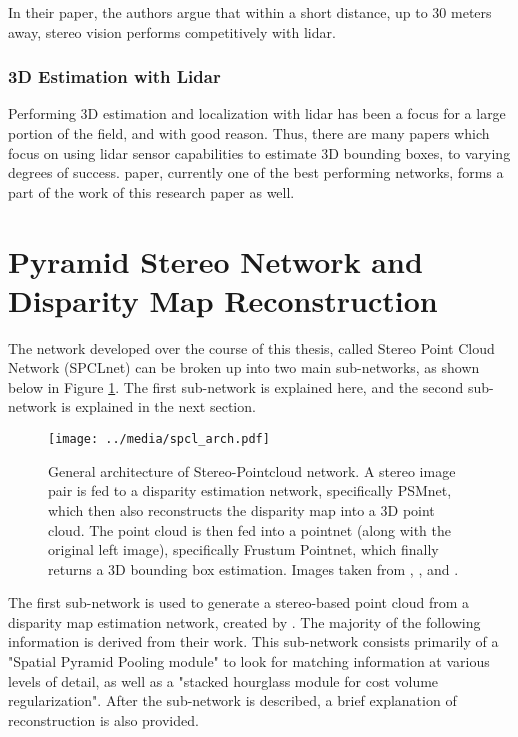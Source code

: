 In their paper, the authors argue that within a short distance, up to 30 meters away, stereo vision performs competitively with lidar.



\subsubsection{3D Estimation with Lidar}
Performing 3D estimation and localization with lidar has been a focus for a large portion of the field, and with good reason. Thus, there are many papers which focus on using lidar sensor capabilities to estimate 3D bounding boxes, to varying degrees of success. \cite{qi_frustum_2017} paper, currently one of the best performing networks, forms a part of the work of this research paper as well.


\newpage
\section{Pyramid Stereo Network and Disparity Map Reconstruction} %
\label{sect_psmnet}
The network developed over the course of this thesis, called Stereo Point Cloud Network (SPCLnet) can be broken up into two main sub-networks, as shown below in Figure \ref{spcl_arch}. The first sub-network is explained here, and the second sub-network is explained in the next section.

\begin{figure}[ht]
	\centering
	\texttt{[image: ../media/spcl\_arch.pdf]}
	\caption{General architecture of Stereo-Pointcloud network. A stereo image pair is fed to a disparity estimation network, specifically PSMnet, which then also reconstructs the disparity map into a 3D point cloud. The point cloud is then fed into a pointnet (along with the original left image), specifically Frustum Pointnet, which finally returns a 3D bounding box estimation. Images taken from \cite{geiger_are_2012}, \cite{chang_pyramid_2018}, and \cite{qi_frustum_2017}.}
	\label{spcl_arch}
\end{figure}

The first sub-network is used to generate a stereo-based point cloud from a disparity map estimation network, created by \cite{chang_pyramid_2018}. The majority of the following information is derived from their work. This sub-network consists primarily of a "Spatial Pyramid Pooling module" to look for matching information at various levels of detail, as well as a "stacked hourglass module for cost volume regularization". After the sub-network is described, a brief explanation of reconstruction is also provided. 

